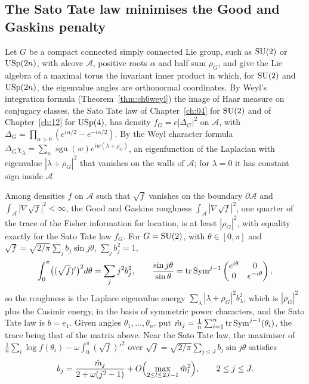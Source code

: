 \subsection{The Sato Tate law minimises the Good and Gaskins penalty}

Let $G$ be a compact connected simply connected Lie group, such as $\mathrm{SU}(2)$ or $\mathrm{USp}(2n)$, with alcove $\mathcal A$, positive roots $\alpha$ and half sum $\rho_G$, and give the Lie algebra of a maximal torus the invariant inner product in which, for $\mathrm{SU}(2)$ and $\mathrm{USp}(2n)$, the eigenvalue angles are orthonormal coordinates. By Weyl's integration formula (Theorem~\ref{thm:ch6weyl}) the image of Haar measure on conjugacy classes, the Sato Tate law of Chapter~\ref{ch:04} for $\mathrm{SU}(2)$ and of Chapter~\ref{ch:12} for $\mathrm{USp}(4)$, has density $f_G=c|\Delta_G|^2$ on $\mathcal A$, with $\Delta_G=\prod_{\alpha>0}(e^{i\alpha/2}-e^{-i\alpha/2})$. By the Weyl character formula $\Delta_G\chi_\lambda=\sum_w\operatorname{sgn}(w)e^{iw(\lambda+\rho_G)}$, an eigenfunction of the Laplacian with eigenvalue $|\lambda+\rho_G|^2$ that vanishes on the walls of $\mathcal A$; for $\lambda=0$ it has constant sign inside $\mathcal A$.

\begin{theorem}\label{thm:lapgg}
Among densities $f$ on $\mathcal A$ such that $\sqrt f$ vanishes on the boundary $\partial\mathcal A$ and $\int_{\mathcal A}|\nabla\sqrt f|^2<\infty$, the Good and Gaskins roughness $\int_{\mathcal A}|\nabla\sqrt f|^2$, one quarter of the trace of the Fisher information for location, is at least $|\rho_G|^2$, with equality exactly for the Sato Tate law $f_G$. For $G=\mathrm{SU}(2)$, with $\theta\in[0,\pi]$ and $\sqrt f=\sqrt{2/\pi}\sum_jb_j\sin j\theta$, $\sum_jb_j^2=1$,
\[
\int_0^\pi\bigl((\sqrt f)'\bigr)^2d\theta=\sum_jj^2b_j^2,\qquad \frac{\sin j\theta}{\sin\theta}=\operatorname{tr}\operatorname{Sym}^{j-1}\begin{pmatrix}e^{i\theta}&0\\0&e^{-i\theta}\end{pmatrix},
\]
so the roughness is the Laplace eigenvalue energy $\sum_\lambda|\lambda+\rho_G|^2b_\lambda^2$, which is $|\rho_G|^2$ plus the Casimir energy, in the basis of symmetric power characters, and the Sato Tate law is $b=e_1$. Given angles $\theta_1,\dots,\theta_n$, put $\hat m_j=\frac1n\sum_{i=1}^n\operatorname{tr}\operatorname{Sym}^{j-1}(\theta_i)$, the trace being that of the matrix above. Near the Sato Tate law, the maximiser of $\frac1n\sum_i\log f(\theta_i)-\omega\int_0^\pi(\sqrt f)'^2$ over $\sqrt f=\sqrt{2/\pi}\sum_{j\le J}b_j\sin j\theta$ satisfies
\[
b_j=\frac{\hat m_j}{2+\omega(j^2-1)}+O\Bigl(\max_{2\le l\le2J-1}\hat m_l^2\Bigr),\qquad 2\le j\le J .
\]
\end{theorem}

